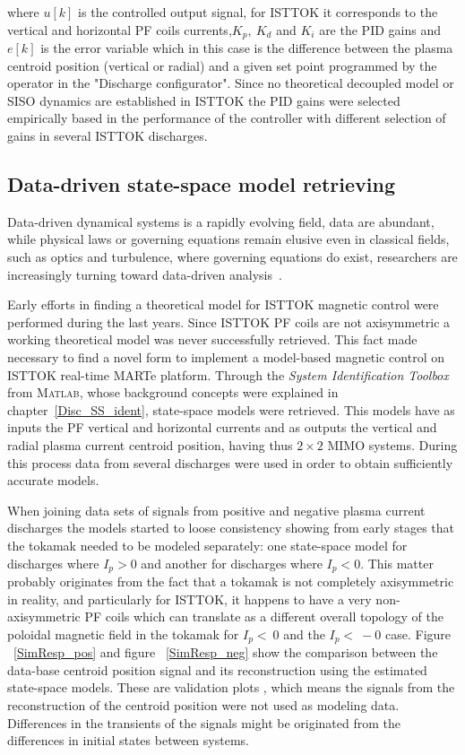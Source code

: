 where $u[k]$ is the controlled output signal, for ISTTOK it corresponds to the vertical and horizontal PF coils currents,$K_p,~K_d$ and $K_i$ are the PID gains and $e[k]$ is the error variable which in this case is the difference between the plasma centroid position (vertical or radial) and  a given set point programmed by the operator in the "Discharge configurator".  Since no theoretical decoupled model or SISO dynamics are established in ISTTOK the PID gains were selected empirically based in the performance of the controller with different selection of gains in several ISTTOK discharges.

\subsection{Data-driven state-space model retrieving }

Data-driven dynamical systems is a rapidly evolving field, data are abundant, while physical laws or governing equations remain elusive even in classical fields, such as optics and turbulence, where governing equations do exist, researchers are increasingly turning toward data-driven analysis~\cite[Chapter~7]{DataDriven2019}.\smallskip

Early efforts in finding a theoretical model for ISTTOK magnetic control were performed during  the last years. Since ISTTOK PF coils are not axisymmetric a working theoretical model  was never successfully retrieved. This fact made necessary to find a novel form to implement a model-based magnetic control on ISTTOK real-time MARTe platform.   Through  the \textit{System Identification Toolbox} from \textsc{Matlab}, whose background concepts were explained in chapter~\ref{Disc_SS_ident}, state-space models were retrieved. This models have as inputs the PF vertical and horizontal currents and as outputs the vertical and radial plasma current centroid position, having thus  $2\times 2$ MIMO systems. During this process data from several discharges were used in order to obtain  sufficiently  accurate models.\smallskip

 When joining data sets of signals from  positive and negative plasma current discharges  the models started to loose consistency showing from early stages that the tokamak needed to be modeled separately: one state-space model for discharges where $I_p > 0$ and another for discharges where $I_p<0$. This matter probably originates from the fact that a  tokamak is not completely axisymmetric in reality, and particularly for ISTTOK, it happens to have a very non-axisymmetric PF coils which can translate as a different overall topology of the poloidal magnetic field in the tokamak for $I_p<~0$ and the  $I_p<~-0$ case. Figure ~\ref{SimResp_pos} and figure ~\ref{SimResp_neg} show the comparison between  the data-base centroid position signal and its reconstruction using the estimated state-space models. These are validation plots , which means the signals from the reconstruction of the centroid position were not used as modeling data. Differences in the transients of the signals might be originated from the differences in initial states between systems.\smallskip



